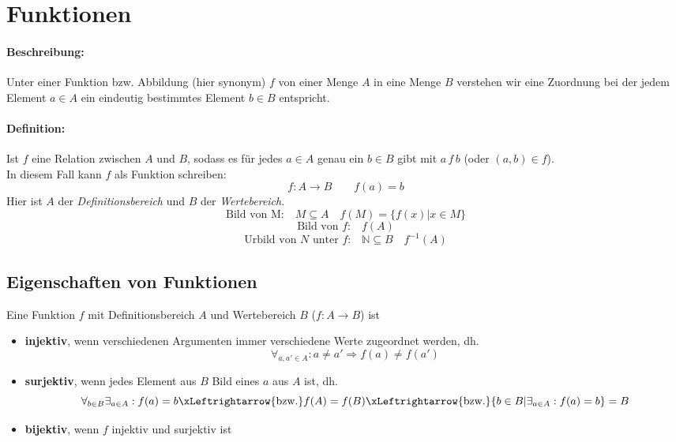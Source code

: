 %

\section{Funktionen}
\paragraph{Beschreibung:}Unter einer Funktion bzw. Abbildung (hier synonym) $f$ von einer Menge $A$ in eine Menge $B$ verstehen wir eine Zuordnung bei der jedem Element $a\in A$ ein eindeutig bestimmtes Element $b\in B$ entspricht.
\paragraph{Definition:}Ist $f$ eine Relation zwischen $A$ und $B$, sodass es für jedes $a\in A$ genau ein $b\in B$ gibt mit $a\, f\, b$ (oder $(a,b)\in f$).\\
In diesem Fall kann $f$ als Funktion schreiben:
\[
f:A\rightarrow B \qquad f(a)=b
\]
Hier ist $A$ der \emph{Definitionsbereich} und $B$ der \emph{Wertebereich}.
\[
\text{Bild von M:} \quad M\subseteq A \quad f(M) = \{f(x) | x\in M\}
\]
\[
\text{Bild von $f$:} \quad f(A)
\]
\[
\text{Urbild von $N$ unter $f$:} \quad \mathbb{N}\subseteq B \quad f^{-1}(A)
\]
\subsection{Eigenschaften von Funktionen}
Eine Funktion $f$ mit Definitionsbereich $A$ und Wertebereich $B$ ($f:A\rightarrow B$) ist
\begin{itemize}
\item \textbf{injektiv}, wenn verschiedenen Argumenten immer verschiedene Werte zugeordnet werden, dh.
\[
\forall_{a,a'\in A}: a\neq a' \Rightarrow f(a)\neq f(a')
\]
\item \textbf{surjektiv}, wenn jedes Element aus $B$ Bild eines $a$ aus $A$ ist, dh.
\[
\forall_{b\in B}\exists_{a\in A}: f(a)=b \xLeftrightarrow{\text{bzw.}} f(A)=f(B) \xLeftrightarrow{\text{bzw.}} \{b\in B | \exists_{a\in A}: f(a)=b\}=B
\]
\item \textbf{bijektiv}, wenn $f$ injektiv und surjektiv ist
\end{itemize}

